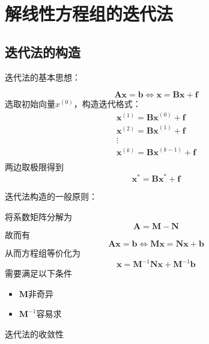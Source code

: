 \section{解线性方程组的迭代法}
\subsection{迭代法的构造}
\begin{note}
    迭代法的基本思想：

    \[
        \boldsymbol{Ax}=\boldsymbol{b}\Leftrightarrow \boldsymbol{x}=\boldsymbol{Bx}+\boldsymbol{f}
    \]
    选取初始向量$x^{(0)}$，构造迭代格式：
    \[
        \begin{aligned}
            \boldsymbol{x}^{(1)} = \boldsymbol{Bx}^{(0)}+\boldsymbol{f}\\
            \boldsymbol{x}^{(2)} = \boldsymbol{Bx}^{(1)}+\boldsymbol{f}\\
            \vdots\\
            \boldsymbol{x}^{(k)} = \boldsymbol{Bx}^{(k-1)}+\boldsymbol{f}\\
        \end{aligned}
    \]
    两边取极限得到
    \[
        \boldsymbol{x}^* = \boldsymbol{Bx}^*+\boldsymbol{f}
    \]
\end{note}
\begin{note}
    迭代法构造的一般原则：

    将系数矩阵分解为
    \[
        \boldsymbol{A} = \boldsymbol{M}-\boldsymbol{N}
    \]
    故而有
    \[
        \boldsymbol{Ax}=\boldsymbol{b}\Leftrightarrow \boldsymbol{Mx}=\boldsymbol{Nx}+\boldsymbol{b}
    \]
    从而方程组等价化为
    \[
        \boldsymbol{x} =\boldsymbol{M}^{-1}\boldsymbol{Nx}+\boldsymbol{M}^{-1}\boldsymbol{b}
    \]
    需要满足以下条件
    \begin{itemize}
        \item $\boldsymbol{M}$非奇异
        \item $\boldsymbol{M}^{-1}$容易求
    \end{itemize}
\end{note}
迭代法的收敛性

